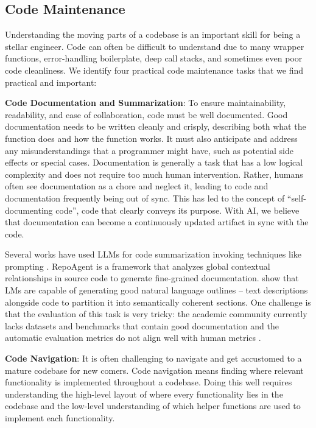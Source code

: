 
\subsection{Code Maintenance}

Understanding the moving parts of a codebase is an important skill for being a stellar engineer. Code can often be difficult to understand due to many wrapper functions, error-handling boilerplate, deep call stacks, and sometimes even poor code cleanliness. We identify four practical code maintenance tasks that we find practical and important:

\textbf{Code Documentation and Summarization}: To ensure maintainability, readability, and ease of collaboration, code must be well documented. Good documentation needs to be written cleanly and crisply, describing both what the function does and how the function works. It must also anticipate and address any misunderstandings that a programmer might have, such as potential side effects or special cases. Documentation is generally a task that has a low logical complexity and does not require too much human intervention. Rather, humans often see documentation as a chore and neglect it, leading to code and documentation frequently being out of sync. This has led to the concept of ``self-documenting code'', code that clearly conveys its purpose. With AI, we believe that documentation can become a continuously updated artifact in sync with the code. 

Several works have used LLMs for code summarization invoking techniques like prompting \citep{sun2024source, su2024distilled, haldar2024analyzing, ahmed2024automatic}. RepoAgent \citep{luo2024repoagent} is a framework that analyzes global contextual relationships in source code to generate fine-grained documentation. \citet{shi2024natural} show that LMs are capable of generating good natural language outlines -- text descriptions alongside code to partition it into semantically coherent sections. One challenge is that the evaluation of this task is very tricky: the academic community currently lacks datasets and benchmarks that contain good documentation and the automatic evaluation metrics do not align well with human metrics \citep{diggs2024leveraging}. 

\textbf{Code Navigation}: It is often challenging to navigate and get accustomed to a mature codebase for new comers. Code navigation means finding where relevant functionality is implemented throughout a codebase. Doing this well requires understanding the high-level layout of where every functionality lies in the codebase and the low-level understanding of which helper functions are used to implement each functionality. 

